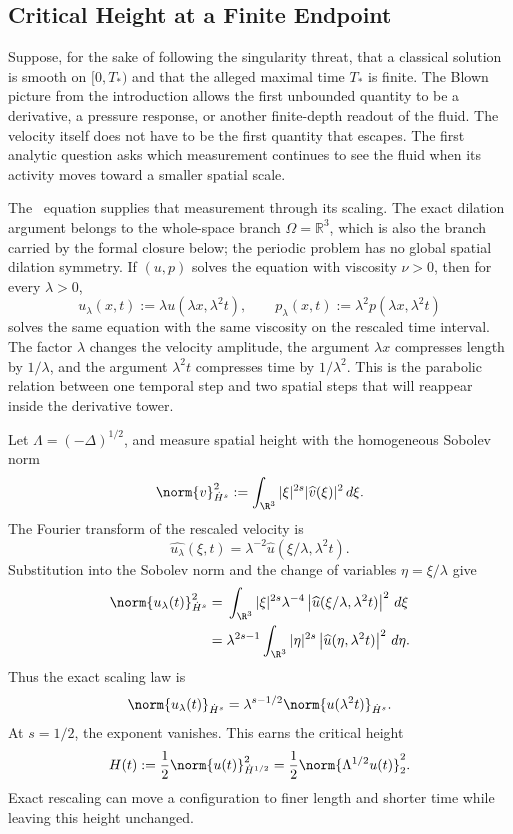 
\subsection{Critical Height at a Finite Endpoint}\label{sub:CriticalHeightAtAFiniteEndpoint}

Suppose, for the sake of following the singularity threat, that a classical solution is smooth on \([0,T_*)\) and that the alleged maximal time \(T_*\) is finite.
The Blown picture from the introduction allows the first unbounded quantity to be a derivative, a pressure response, or another finite-depth readout of the fluid.
The velocity itself does not have to be the first quantity that escapes.
The first analytic question asks which measurement continues to see the fluid when its activity moves toward a smaller spatial scale.

The \NavierStokes\ equation supplies that measurement through its scaling.
The exact dilation argument belongs to the whole-space branch \(\Omega=\mathbb R^3\), which is also the branch carried by the formal closure below; the periodic problem has no global spatial dilation symmetry.
If \((u,p)\) solves the equation with viscosity \(\nu>0\), then for every \(\lambda>0\),
\[
  u_\lambda(x,t)
  :=\lambda u(\lambda x,\lambda^2t),
  \qquad
  p_\lambda(x,t)
  :=\lambda^2p(\lambda x,\lambda^2t)
\]
solves the same equation with the same viscosity on the rescaled time interval.
The factor \(\lambda\) changes the velocity amplitude, the argument \(\lambda x\) compresses length by \(1/\lambda\), and the argument \(\lambda^2t\) compresses time by \(1/\lambda^2\).
This is the parabolic relation between one temporal step and two spatial steps that will reappear inside the derivative tower.

Let \(\Lambda=(-\Delta)^{1/2}\), and measure spatial height with the homogeneous Sobolev norm
\[
  \norm{v}_{\dot H^s}^2
  :=
  \int_{\R^3}|\xi|^{2s}|\widehat v(\xi)|^2\,d\xi.
\]
The Fourier transform of the rescaled velocity is
\[
  \widehat{u_\lambda}(\xi,t)
  =
  \lambda^{-2}\widehat u(\xi/\lambda,\lambda^2t).
\]
Substitution into the Sobolev norm and the change of variables \(\eta=\xi/\lambda\) give
\begin{align*}
  \norm{u_\lambda(t)}_{\dot H^s}^{2}
  &={}
  \int_{\R^3}
  |\xi|^{2s}\lambda^{-4}
  \left|\widehat u(\xi/\lambda,\lambda^2t)\right|^2
  \,d\xi
  \\
  &={}
  \lambda^{2s-1}
  \int_{\R^3}
  |\eta|^{2s}
  \left|\widehat u(\eta,\lambda^2t)\right|^2
  \,d\eta.
\end{align*}
Thus the exact scaling law is
\[
  \norm{u_\lambda(t)}_{\dot H^s}
  =
  \lambda^{s-1/2}
  \norm{u(\lambda^2t)}_{\dot H^s}.
\]
At \(s=1/2\), the exponent vanishes.
This earns the critical height
\[
  H(t)
  :=
  \frac12\norm{u(t)}_{\dot H^{1/2}}^2
  =
  \frac12\norm{\Lambda^{1/2}u(t)}_2^2.
\]
Exact rescaling can move a configuration to finer length and shorter time while leaving this height unchanged.

